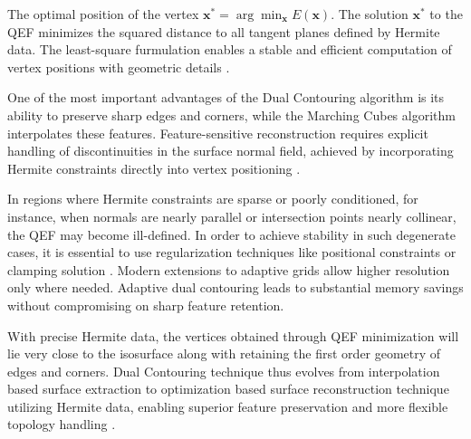 \documentclass[12pt, a4paper, oneside]{book}
\theoremstyle{plain}
\theoremstyle{definition}
\theoremstyle{remark}
\theoremstyle{definition}
\begin{document}
The optimal position of the vertex $\mathbf{x}^* = \arg\min_{\mathbf{x}} E(\mathbf{x})$. The solution $\mathbf{x}^*$ to the QEF minimizes the squared distance to all tangent planes defined by Hermite data. The least-square furmulation enables a stable and efficient computation of vertex positions with geometric details \cite{ju2002dual}.  

One of the most important advantages of the Dual Contouring algorithm is its ability to preserve sharp edges and corners, while the Marching Cubes algorithm interpolates these features. Feature-sensitive reconstruction requires explicit handling of discontinuities in the surface normal field, achieved by incorporating Hermite constraints directly into vertex positioning \cite{kobbelt2001feature}.

In regions where Hermite constraints are sparse or poorly conditioned, for instance, when normals are nearly parallel or intersection points nearly collinear, the QEF may become ill-defined. In order to achieve stability in such degenerate cases, it is essential to use regularization techniques like positional constraints or clamping solution \cite{ju2002dual}.  Modern extensions to adaptive grids allow higher resolution only where needed.  Adaptive dual contouring leads to substantial memory savings without compromising on sharp feature retention.

With precise Hermite data, the vertices obtained through QEF minimization will lie very close to the isosurface along with retaining the first order geometry of edges and corners. Dual Contouring technique thus evolves from interpolation based surface extraction to optimization based surface reconstruction technique utilizing Hermite data, enabling superior feature preservation and more flexible topology handling \cite{ju2002dual,kobbelt2001feature}.
\end{document}
